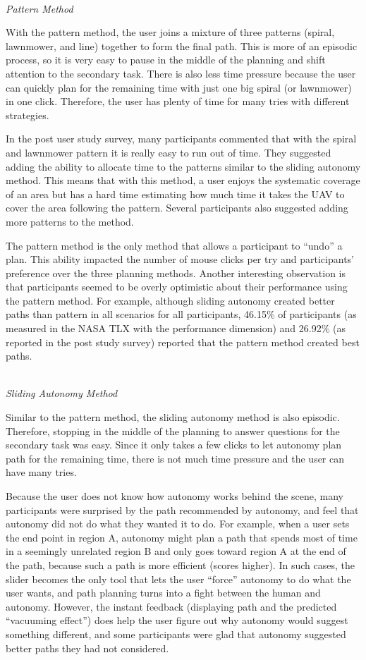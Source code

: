 ~\\ \noindent \textit{Pattern Method}

With the pattern method, the user joins a mixture of three patterns (spiral, lawnmower, and line) together to form the final path. This is more of an episodic process, so it is very easy to pause in the middle of the planning and shift attention to the secondary task. There is also less time pressure because the user can quickly plan for the remaining time with just one big spiral (or lawnmower) in one click. Therefore, the user has plenty of time for many tries with different strategies.

In the post user study survey, many participants commented that with the spiral and lawnmower pattern it is really easy to run out of time. They suggested adding the ability to allocate time to the patterns similar to the sliding autonomy method. This means that with this method, a user enjoys the systematic coverage of an area but has a hard time estimating how much time it takes the UAV to cover the area following the pattern. Several participants also suggested adding more patterns to the method. 

The pattern method is the only method that allows a participant to ``undo'' a plan. This ability impacted the number of mouse clicks per try and participants' preference over the three planning methods. Another interesting observation is that participants seemed to be overly optimistic about their performance using the pattern method. For example, although sliding autonomy created better paths than pattern in all scenarios for all participants, 46.15\% of participants (as measured in the NASA TLX with the performance dimension) and 26.92\% (as reported in the post study survey) reported that the pattern method created best paths.

~\\ \noindent \textit{Sliding Autonomy Method}

Similar to the pattern method, the sliding autonomy method is also episodic. Therefore, stopping in the middle of the planning to answer questions for the secondary task was easy. Since it only takes a few clicks to let autonomy plan path for the remaining time, there is not much time pressure and the user can have many tries. 

Because the user does not know how autonomy works behind the scene, many participants were surprised by the path recommended by autonomy, and feel that autonomy did not do what they wanted it to do. For example, when a user sets the end point in region A, autonomy might plan a path that spends most of time in a seemingly unrelated region B and only goes toward region A at the end of the path, because such a path is more efficient (scores higher). In such cases, the slider becomes the only tool that lets the user ``force'' autonomy to do what the user wants, and path planning turns into a fight between the human and autonomy. However, the instant feedback (displaying path and the predicted ``vacuuming effect'') does help the user figure out why autonomy would suggest something different, and some participants were glad that autonomy suggested better paths they had not considered. 


